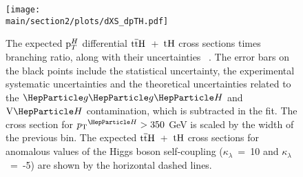\begin{figure}[htb!]
        \centering
        \texttt{[image: \\main/section2/plots/dXS\_dpTH.pdf]}
        \caption{The expected $\mathrm{p}_{T}^H$ differential $\text{t}\overline{\text{t}}\text{H}$~+~$\text{tH}$ cross sections times branching ratio, along with their uncertainties ~\cite{CMS-PAS-FTR-18-020}. The error bars on the black points include the statistical uncertainty, the experimental systematic uncertainties and the theoretical uncertainties related to the $\ggh$ and $\vh$ contamination, which is subtracted in the fit.  The cross section for $\pTH > 350$ GeV is scaled by the width of the previous bin. The expected $\text{t}\overline{\text{t}}\text{H}$~+~$\text{tH}$ cross sections for anomalous values of the Higgs boson self-coupling ($\kappa_\lambda$~=~10 and $\kappa_\lambda$~=~-5) are shown by the horizontal dashed lines.}
        \label{fig:ttHdiff_CMS_ptH_xs}
\end{figure}


